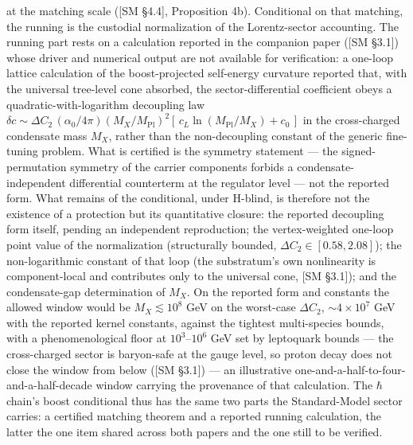 \documentclass[
]{article}
\begin{document}
at the matching scale ({[}SM §4.4{]}, Proposition 4b). Conditional on
that matching, the running is the custodial normalization of the
Lorentz-sector accounting. The running part rests on a calculation
reported in the companion paper ({[}SM §3.1{]}) whose driver and
numerical output are not available for verification: a one-loop lattice
calculation of the boost-projected self-energy curvature reported that,
with the universal tree-level cone absorbed, the sector-differential
coefficient obeys a quadratic-with-logarithm decoupling law
\(\delta c \sim \Delta C_2\,(\alpha_0/4\pi)(M_X/M_{\text{Pl}})^2[\,c_L\ln(M_{\text{Pl}}/M_X)+c_0\,]\)
in the cross-charged condensate mass \(M_X\), rather than the
non-decoupling constant of the generic fine-tuning problem. What is
certified is the symmetry statement --- the signed-permutation symmetry
of the carrier components forbids a condensate-independent differential
counterterm at the regulator level --- not the reported form. What
remains of the conditional, under H-blind, is therefore not the
existence of a protection but its quantitative closure: the reported
decoupling form itself, pending an independent reproduction; the
vertex-weighted one-loop point value of the normalization (structurally
bounded, \(\Delta C_2 \in [0.58, 2.08]\)); the non-logarithmic constant
of that loop (the substratum's own nonlinearity is component-local and
contributes only to the universal cone, {[}SM §3.1{]}); and the
condensate-gap determination of \(M_X\). On the reported form and
constants the allowed window would be \(M_X \lesssim 10^{8}\) GeV on the
worst-case \(\Delta C_2\), \(\sim 4\times10^{7}\) GeV with the reported
kernel constants, against the tightest multi-species bounds, with a
phenomenological floor at \(10^{3}\)--\(10^{6}\) GeV set by leptoquark
bounds --- the cross-charged sector is baryon-safe at the gauge level,
so proton decay does not close the window from below ({[}SM §3.1{]}) ---
an illustrative one-and-a-half-to-four-and-a-half-decade window carrying
the provenance of that calculation. The \(\hbar\) chain's boost
conditional thus has the same two parts the Standard-Model sector
carries: a certified matching theorem and a reported running
calculation, the latter the one item shared across both papers and the
one still to be verified.
\end{document}
